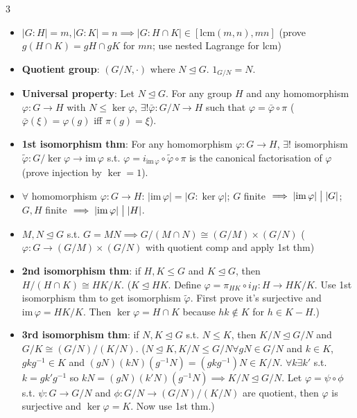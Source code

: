 \documentclass[10pt]{article}
\newcommand{\abs}[1]{\left\lvert#1\right\rvert} %
\begin{document}
\begin{multicols*}{3}
\begin{itemize}
            \item $\abs{G \colon H} = m, \abs{G \colon K} = n \implies \abs{G \colon H \cap K} \in \left[\mathrm{lcm}\left(m, n\right), mn\right]$ (prove $g\left(H \cap K\right) = gH \cap gK$ for $mn$; use nested Lagrange for $\mathrm{lcm}$)
            \item \textbf{Quotient group}: $\left(G \slash N, \cdot\right)$ where $N \trianglelefteq G$. $1_{G \slash N} = N$.
            \item \textbf{Universal property}: Let $N \trianglelefteq G$. For any group $H$ and any homomorphism $\varphi \colon G \to H$ with $N \leq \ker{\varphi}$, $\exists! \bar{\varphi} \colon G \slash N \to H$ such that $\varphi = \bar{\varphi} \circ \pi$ ($\bar{\varphi}\left(\xi\right) = \varphi\left(g\right)$ iff $\pi\left(g\right) = \xi$).
            \item \textbf{1st isomorphism thm}: For any homomorphism $\varphi \colon G \to H$, $\exists!$ isomorphism $\tilde{\varphi} \colon G \slash \ker{\varphi} \to \mathrm{im}\,{\varphi}$ s.t. $\varphi = i_{\mathrm{im}\,{\varphi}} \circ \tilde{\varphi} \circ \pi$ is the canonical factorisation of $\varphi$ (prove injection by $\ker = 1$).
            \item $\forall$ homomorphism $\varphi \colon G \to H$: $\abs{\mathrm{im}\,{\varphi}} = \abs{G \colon \ker{\varphi}}$; $G$ finite $\implies\abs{\mathrm{im}\,{\varphi}} \bigm\vert \abs{G}$; $G, H$ finite $\implies\abs{\mathrm{im}\,{\varphi}} \bigm\vert \abs{H}$.
            \item $M, N \trianglelefteq G$ s.t. $G = MN \implies G \slash \left(M \cap N\right) \cong \left(G \slash M\right) \times \left(G \slash N\right)$ ($\varphi \colon G \to \left(G \slash M\right) \times \left(G \slash N\right)$ with quotient comp and apply 1st thm)
            \item \textbf{2nd isomorphism thm}: if $H, K \leq G$ and $K \trianglelefteq G$, then $H \slash \left(H \cap K\right) \cong HK \slash K$. ($K \trianglelefteq HK$. Define $\varphi = \pi_{HK} \circ i_H \colon H \to HK \slash K$. Use 1st isomorphism thm to get isomorphism $\tilde{\varphi}$. First prove it's surjective and $\mathrm{im}\,\varphi = HK \slash K$. Then $\ker{\varphi} = H\cap K$ because $hk \notin K$ for $h \in K - H$.)
            \item \textbf{3rd isomorphism thm}: if $N, K \trianglelefteq G$ s.t. $N \leq K$, then $K \slash N \trianglelefteq G \slash N$ and $G \slash K \cong \left(G \slash N\right) \slash \left(K \slash N\right)$. ($N \trianglelefteq K, K \slash N \leq G \slash N \forall gN \in G \slash N$ and $k \in K$, $gkg^{-1} \in K$ and $\left(gN\right)\left(kN\right)\left(g^{-1}N\right) = \left(gkg^{-1}\right)N \in K \slash N$. $\forall k \exists k'$ s.t. $k = gk'g^{-1}$ so $kN = \left(gN\right)\left(k'N\right)\left(g^{-1}N\right) \implies K \slash N \trianglelefteq G \slash N$. Let $\varphi = \psi \circ \phi$ s.t. $\psi \colon G \to G \slash N$ and $\phi \colon G \slash N \to \left(G \slash N\right) \slash \left(K \slash N\right)$ are quotient, then $\varphi$ is surjective and $\ker{\varphi} = K$. Now use 1st thm.)

\end{itemize}
\end{multicols*}
\end{document}

